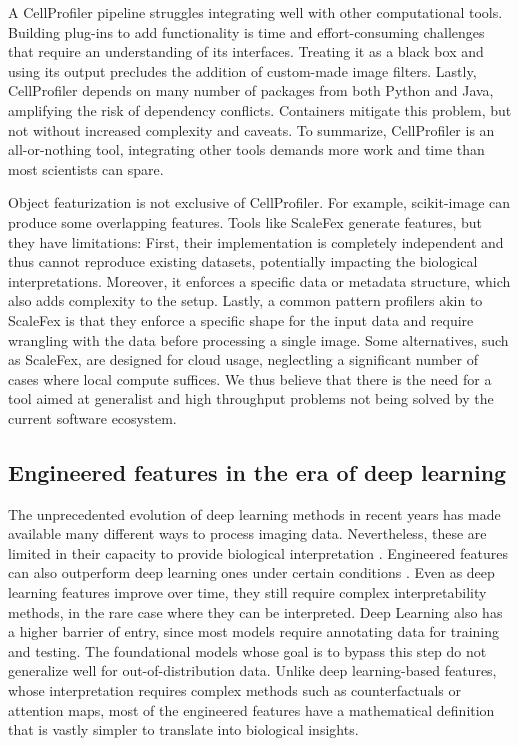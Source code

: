 \documentclass{article}
\begin{document}
A CellProfiler pipeline struggles integrating well with other computational tools. Building plug-ins to add functionality is time and effort-consuming challenges that require an understanding of its interfaces. Treating it as a black box and using its output precludes the addition of custom-made image filters. Lastly, CellProfiler depends on many number of packages from both Python and Java, amplifying the risk of dependency conflicts. Containers mitigate this problem, but not without increased complexity and caveats. To summarize, CellProfiler is an all-or-nothing tool, integrating other tools demands more work and time than most scientists can spare.

Object featurization is not exclusive of CellProfiler. For example, scikit-image can produce some overlapping features. Tools like ScaleFex \citep{comoletHighlyEfficientScalable2024,einarolafssonSpaCr2025} generate features, but they have limitations: First, their implementation is completely independent and thus cannot reproduce existing datasets, potentially impacting the biological interpretations. Moreover, it enforces a specific data or metadata structure, which also adds complexity to the setup. Lastly, a common pattern profilers akin to ScaleFex is that they enforce a specific shape for the input data and require wrangling with the data before processing a single image. Some alternatives, such as ScaleFex, are designed for cloud usage, neglectling a significant number of cases where local compute suffices. We thus believe that there is the need for a tool aimed at generalist and high throughput problems not being solved by the current software ecosystem.
\subsection{Engineered features in the era of deep learning}
\label{sec:org9dc3dfa}
The unprecedented evolution of deep learning methods in recent years has made available many different ways to process imaging data. Nevertheless, these are limited in their capacity to provide biological interpretation \citep{moenDeepLearningCellular2019}. Engineered features can also outperform deep learning ones under certain conditions \citep{tangMorphologicalProfilingDrug2024}. Even as deep learning features improve over time, they still require complex interpretability methods, in the rare case where they can be interpreted. Deep Learning also has a higher barrier of entry, since most models require annotating data for training and testing. The foundational models whose goal is to bypass this step do not generalize well for out-of-distribution data. Unlike deep learning-based features, whose interpretation requires complex methods such as counterfactuals or attention maps, most of the engineered features have a mathematical definition that is vastly simpler to translate into biological insights.
\end{document}
